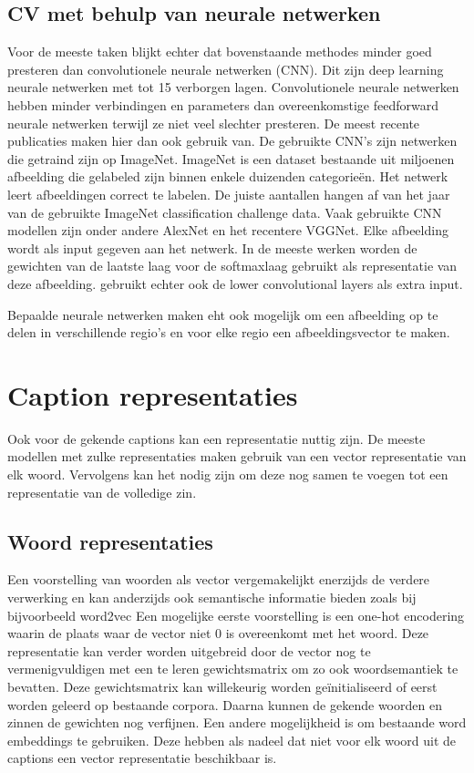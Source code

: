 \subsection{CV met behulp van neurale netwerken}
Voor de meeste taken blijkt echter dat bovenstaande methodes minder goed presteren dan convolutionele neurale netwerken (CNN). Dit zijn deep learning neurale netwerken met tot 15 verborgen lagen. Convolutionele neurale netwerken hebben minder verbindingen en parameters dan overeenkomstige feedforward neurale netwerken terwijl ze niet veel slechter presteren. \cite{Krizhevsky} De meest recente publicaties maken hier dan ook gebruik van. De gebruikte CNN's zijn netwerken die getraind zijn op ImageNet.\cite{imagenet} ImageNet is een dataset bestaande uit miljoenen afbeelding die gelabeled zijn binnen enkele duizenden categorie\"en. Het netwerk leert afbeeldingen correct te labelen. De juiste aantallen hangen af van het jaar van de gebruikte ImageNet classification challenge data. Vaak gebruikte CNN modellen zijn onder andere AlexNet \cite{Krizhevsky} en het recentere VGGNet\cite{Simonyan}. Elke afbeelding wordt als input gegeven aan het netwerk. In de meeste werken worden de gewichten van de laatste laag voor de softmaxlaag gebruikt als representatie van deze afbeelding.  \cite{Xu attention} gebruikt echter ook de lower convolutional layers als extra input.

Bepaalde neurale netwerken maken eht ook mogelijk om een afbeelding op te delen in verschillende regio's en voor elke regio een afbeeldingsvector te maken.\cite{karpathy}\cite{Fang}

\section{Caption representaties}
Ook voor de gekende captions kan een representatie nuttig zijn. De meeste modellen met zulke representaties maken gebruik van een vector representatie van elk woord. Vervolgens kan het nodig zijn om deze nog samen te voegen tot een representatie van de volledige zin.

\subsection{Woord representaties}
 Een voorstelling van woorden als vector vergemakelijkt enerzijds de verdere verwerking en kan anderzijds ook semantische informatie bieden zoals bij bijvoorbeeld word2vec\cite{mikolov}
 Een mogelijke eerste voorstelling is een one-hot encodering waarin de plaats waar de vector niet 0 is overeenkomt met het woord. Deze representatie kan verder worden uitgebreid door de vector nog te vermenigvuldigen met een te leren gewichtsmatrix om zo ook woordsemantiek te bevatten. Deze gewichtsmatrix kan willekeurig worden ge\"initialiseerd of eerst worden geleerd op bestaande corpora.\cite{Lebret}\cite{Vinyals}\cite{Mao} Daarna kunnen de gekende woorden en zinnen de gewichten nog verfijnen.  Een andere mogelijkheid is om bestaande word embeddings te gebruiken.\cite{mikolov} Deze hebben als nadeel dat niet voor elk woord uit de captions een vector representatie beschikbaar is. 
 
